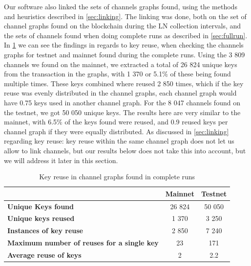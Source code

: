 Our software also linked the sets of channels graphs found, using the methods and heuristics described in \cref{sec:linking}.
The linking was done, both on the set of channel graphs found on the blockchain during the LN collection intervals, and the sets of channels found when doing complete runs as described in \cref{sec:fullrun}. In \cref{key_reuse_table} we can see the findings in regards to key reuse, when checking the channels graphs for testnet and mainnet found during the complete runs. Using the 3 809 channels we found on the mainnet, we extracted a total of 26 824 unique keys from the transaction in the graphs, with 1 370 or 5.1\% of these being found multiple times. These keys combined where reused 2 850 times, which if the key reuse was evenly distributed in the channel graphs, each channel graph would have 0.75 keys used in another channel graph. For the 8 047 channels found on the testnet, we got 50 050 unique keys. The results here are very similar to the mainnet, with 6.5\% of the keys found were reused, and 0.9 reused keys per channel graph if they were equally distributed. As discussed in \cref{sec:linking} regarding key reuse: key reuse within the same channel graph does not let us allow to link channels, but our results below does not take this into account, but we will address it later in this section.
\\

\begin{table}[ht]
\centering
\caption{Key reuse in channel graphs found in complete runs}
\label{key_reuse_table}
\begin{tabular}{l|c|c}
                                                    & \textbf{Mainnet} & \textbf{Testnet} \\ \hline
\textbf{Unique Keys found}                         & 26 824              & 50 050 \\ \hline
\textbf{Unique keys reused}                        & 1 370               & 3 250 \\ \hline
\textbf{Instances of key reuse}                    & 2 850               & 7 240 \\ \hline
\textbf{Maximum number of reuses for a single key} & 23               & 171 \\ \hline
\textbf{Average reuse of keys}                     & 2                & 2.2  \\ \hline
\end{tabular}
\end{table}

